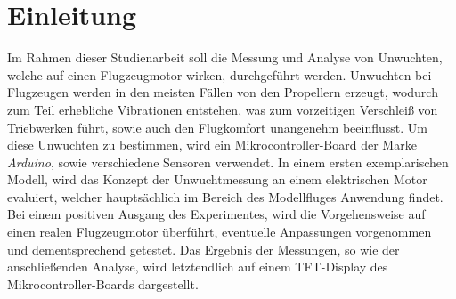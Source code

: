 
\chapter{Einleitung}
Im Rahmen dieser Studienarbeit soll die Messung und Analyse von Unwuchten, welche auf einen Flugzeugmotor wirken, durchgeführt werden. Unwuchten bei Flugzeugen werden in den meisten Fällen von den Propellern erzeugt, wodurch zum Teil erhebliche Vibrationen entstehen, was zum vorzeitigen Verschleiß von Triebwerken führt, sowie auch den Flugkomfort unangenehm beeinflusst. Um diese Unwuchten zu bestimmen, wird ein Mikrocontroller-Board der Marke \textit{Arduino}, sowie verschiedene Sensoren verwendet. In einem ersten exemplarischen Modell, wird das Konzept der Unwuchtmessung an einem elektrischen Motor evaluiert, welcher hauptsächlich im Bereich des Modellfluges Anwendung findet. Bei einem positiven Ausgang des Experimentes, wird die Vorgehensweise auf einen realen Flugzeugmotor überführt, eventuelle Anpassungen vorgenommen und dementsprechend getestet. Das Ergebnis der Messungen, so wie der anschließenden Analyse, wird letztendlich auf einem TFT-Display des Mikrocontroller-Boards dargestellt.